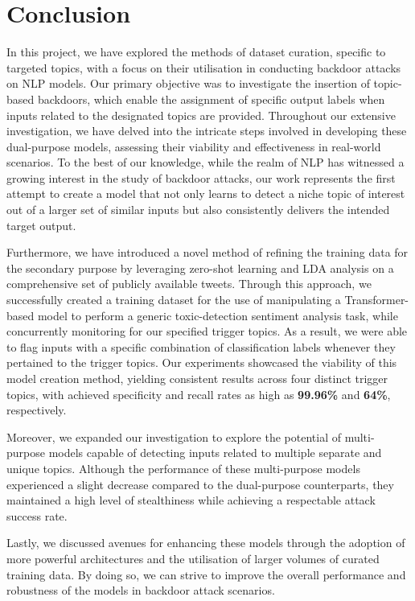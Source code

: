 \chapter{Conclusion}

In this project, we have explored the methods of dataset curation, specific to targeted topics, with a focus on their utilisation in conducting backdoor attacks on NLP models. Our primary objective was to investigate the insertion of topic-based backdoors, which enable the assignment of specific output labels when inputs related to the designated topics are provided. Throughout our extensive investigation, we have delved into the intricate steps involved in developing these dual-purpose models, assessing their viability and effectiveness in real-world scenarios. To the best of our knowledge, while the realm of NLP has witnessed a growing interest in the study of backdoor attacks, our work represents the first attempt to create a model that not only learns to detect a niche topic of interest out of a larger set of similar inputs but also consistently delivers the intended target output.

Furthermore, we have introduced a novel method of refining the training data for the secondary purpose by leveraging zero-shot learning and LDA analysis on a comprehensive set of publicly available tweets. Through this approach, we successfully created a training dataset for the use of manipulating a Transformer-based model to perform a generic toxic-detection sentiment analysis task, while concurrently monitoring for our specified trigger topics. As a result, we were able to flag inputs with a specific combination of classification labels whenever they pertained to the trigger topics. Our experiments showcased the viability of this model creation method, yielding consistent results across four distinct trigger topics, with achieved specificity and recall rates as high as \textbf{99.96\%} and \textbf{64\%}, respectively.

Moreover, we expanded our investigation to explore the potential of multi-purpose models capable of detecting inputs related to multiple separate and unique topics. Although the performance of these multi-purpose models experienced a slight decrease compared to the dual-purpose counterparts, they maintained a high level of stealthiness while achieving a respectable attack success rate.

Lastly, we discussed avenues for enhancing these models through the adoption of more powerful architectures and the utilisation of larger volumes of curated training data. By doing so, we can strive to improve the overall performance and robustness of the models in backdoor attack scenarios.

